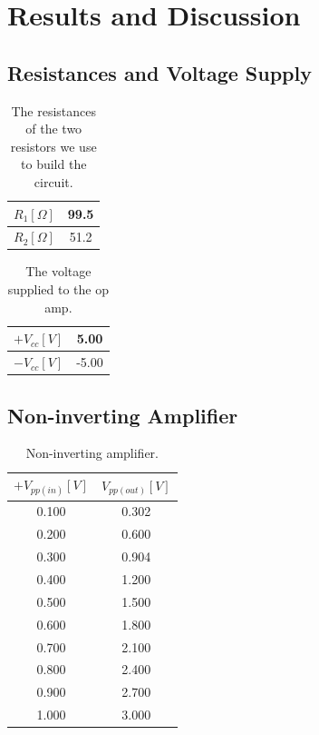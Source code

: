 \documentclass{article}
\begin{document}
\section{Results and Discussion}

\subsection{Resistances and Voltage Supply}

\begin{table}[!h]
\begin{center}
\begin{tabular}{|c|c|}
\hline
$R_1[\Omega]$ & 99.5 \\
\hline
$R_2[\Omega]$ & 51.2 \\
\hline
\end{tabular}
\caption{The resistances of the two resistors we use to build the circuit.}
\label{tab-1}
\end{center}
\end{table}

\begin{table}[!h]
\begin{center}
\begin{tabular}{|c|c|}
\hline
$+V_{cc}[V]$ & 5.00 \\
\hline
$-V_{cc}[V]$ & -5.00 \\
\hline
\end{tabular}
\caption{The voltage supplied to the op amp.}
\label{tab-2}
\end{center}
\end{table}

\subsection{Non-inverting Amplifier}

\begin{table}[!h]
\begin{center}
\begin{tabular}{|c|c|}
\hline
$+V_{pp(in)}[V]$ & $V_{pp(out)}[V]$ \\
\hline
0.100	&	0.302\\
\hline
0.200	&	0.600\\
\hline
0.300	&	0.904\\
\hline
0.400	&	1.200\\
\hline
0.500	&	1.500\\
\hline
0.600	&	1.800\\
\hline
0.700	&	2.100\\
\hline
0.800	&	2.400\\
\hline
0.900	&	2.700\\
\hline
1.000	&	3.000\\
\hline
\end{tabular}
\caption{Non-inverting amplifier.}
\label{tab-3}
\end{center}
\end{table}
\end{document}
